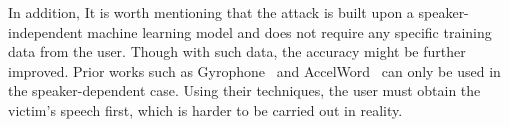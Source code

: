 In addition, It is worth mentioning that the {\attackName} attack is built upon a speaker-independent machine learning model and does not require any specific training data from the user. Though with such data, the accuracy might be further improved. Prior works such as Gyrophone~\cite{michalevsky2014gyrophone} and AccelWord~\cite{zhang2015accelword} can only be used in the speaker-dependent case. Using their techniques, the user must obtain the victim's speech first, which is harder to be carried out in reality.



